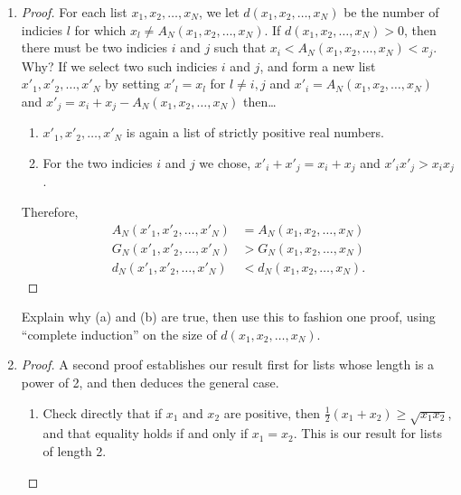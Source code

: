 \documentclass[11pt]{article}
\begin{document}
 \begin{enumerate}[label=(\roman*)]
  \item \begin{proof}
     For each list \(x_1, x_2, \dots, x_N\), we let \(d(x_1, x_2, \dots, x_N)\) be the number of indicies \(l\) for which 
     \(x_l \neq A_N (x_1, x_2, \dots, x_N)\).  If \(d(x_1, x_2, \dots, x_N) > 0\), then there must be two indicies \(i\) 
     and \(j\) such that \(x_i < A_N (x_1, x_2, \dots, x_N) < x_j\).  Why?  If we select two such indicies \(i\) and \(j\), 
     and form a new list \(x'_1, x'_2, \dots, x'_N\) by setting \(x'_l = x_l\) for \(l \neq i,j\) and 
     \(x'_i = A_N (x_1, x_2, \dots, x_N)\) and \(x'_j = x_i + x_j - A_N (x_1, x_2, \dots, x_N)\) then\dots

     \begin{enumerate}[label=(\alph*)]
       \item \(x'_1, x'_2, \dots, x'_N\) is again a list of strictly positive real numbers.
       \item For the two indicies \(i\) and \(j\) we chose, \(x'_i + x'_j = x_i + x_j\) and \(x'_i x'_j > x_i x_j\).
     \end{enumerate}

     Therefore, 
     \begin{align*}
       A_N (x'_1, x'_2, \dots, x'_N) &= A_N (x_1, x_2, \dots, x_N) \\
       G_N (x'_1, x'_2, \dots, x'_N) &> G_N (x_1, x_2, \dots, x_N) \\
       d_N (x'_1, x'_2, \dots, x'_N) &< d_N (x_1, x_2, \dots, x_N).
     \end{align*}
   \end{proof}
     Explain why (a) and (b) are true, then use this to fashion one proof, using ``complete induction'' on the size of 
     \(d(x_1, x_2, \dots, x_N)\).

  \item \begin{proof}
    A second proof establishes our result first for lists whose length is a power of 2, and then deduces the general case.
    \begin{enumerate}[label=(\alph*)]
      \item Check directly that if \(x_1\) and \(x_2\) are positive, then \(\frac{1}{2}(x_1 + x_2) \geq \sqrt{x_1 x_2}\), 
        and that equality holds if and only if \(x_1 = x_2\).  This is our result for lists of length 2.


\end{enumerate}
\end{proof}
\end{enumerate}
\end{document}
